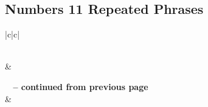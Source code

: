\subsection{Numbers 11 Repeated Phrases}


\normalsize
 
\begin{center}
\begin{longtable}{|c|c|}
\caption[Numbers 11 Repeated Phrases]{Numbers 11 Repeated Phrases}\label{table:Repeated Phrases Numbers 11} \\
\hline {} &  \\ \hline 
\endfirsthead
 
{{\bfseries \tablename\ \thetable{} -- continued from previous page}} \\  
\hline {} &  \\ \hline 
\endhead
 

\end{longtable}
\end{center}
